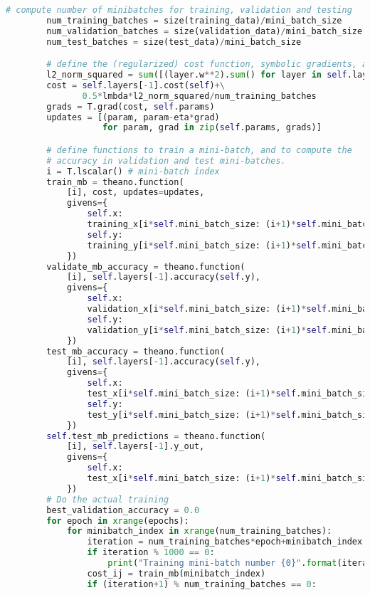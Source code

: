 \begin{lstlisting}[language=Python]
        # compute number of minibatches for training, validation and testing
        num_training_batches = size(training_data)/mini_batch_size
        num_validation_batches = size(validation_data)/mini_batch_size
        num_test_batches = size(test_data)/mini_batch_size

        # define the (regularized) cost function, symbolic gradients, and updates
        l2_norm_squared = sum([(layer.w**2).sum() for layer in self.layers])
        cost = self.layers[-1].cost(self)+\
               0.5*lmbda*l2_norm_squared/num_training_batches
        grads = T.grad(cost, self.params)
        updates = [(param, param-eta*grad)
                   for param, grad in zip(self.params, grads)]

        # define functions to train a mini-batch, and to compute the
        # accuracy in validation and test mini-batches.
        i = T.lscalar() # mini-batch index
        train_mb = theano.function(
            [i], cost, updates=updates,
            givens={
                self.x:
                training_x[i*self.mini_batch_size: (i+1)*self.mini_batch_size],
                self.y:
                training_y[i*self.mini_batch_size: (i+1)*self.mini_batch_size]
            })
        validate_mb_accuracy = theano.function(
            [i], self.layers[-1].accuracy(self.y),
            givens={
                self.x:
                validation_x[i*self.mini_batch_size: (i+1)*self.mini_batch_size],
                self.y:
                validation_y[i*self.mini_batch_size: (i+1)*self.mini_batch_size]
            })
        test_mb_accuracy = theano.function(
            [i], self.layers[-1].accuracy(self.y),
            givens={
                self.x:
                test_x[i*self.mini_batch_size: (i+1)*self.mini_batch_size],
                self.y:
                test_y[i*self.mini_batch_size: (i+1)*self.mini_batch_size]
            })
        self.test_mb_predictions = theano.function(
            [i], self.layers[-1].y_out,
            givens={
                self.x:
                test_x[i*self.mini_batch_size: (i+1)*self.mini_batch_size]
            })
        # Do the actual training
        best_validation_accuracy = 0.0
        for epoch in xrange(epochs):
            for minibatch_index in xrange(num_training_batches):
                iteration = num_training_batches*epoch+minibatch_index
                if iteration % 1000 == 0:
                    print("Training mini-batch number {0}".format(iteration))
                cost_ij = train_mb(minibatch_index)
                if (iteration+1) % num_training_batches == 0:

\end{lstlisting}
